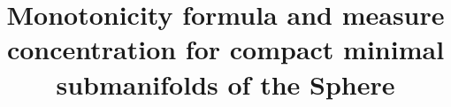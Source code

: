 \documentclass{amsart}
\theoremstyle{definition}
\theoremstyle{remark}
\begin{document}
\title[Measure Concentration]{Monotonicity formula and measure concentration for compact minimal submanifolds of the Sphere}
\cite{Bengtsson}
\cite{YauMR0645728}
\cite{MR0742598}
\cite{MR0814078}
\cite{MR3080491}
\cite{Choi1983559}



\end{document}
